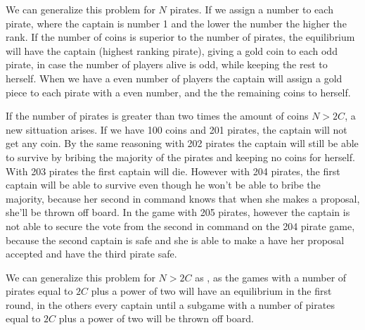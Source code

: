 We can generalize this problem for $N$ pirates. If we assign a number to each pirate, where the captain is number 1 and the lower the number the higher the rank. If the number of coins is superior to the number of pirates, the equilibrium will have the captain (highest ranking pirate), giving a gold coin to each odd pirate, in case the number of players alive is odd, while keeping the rest to herself. When we have a even number of players the captain will assign a gold piece to each pirate with a even number, and the the remaining coins to herself. 

If the number of pirates is greater than two times the amount of coins $N>2C$, a new sittuation arises. If we have 100 coins and 201 pirates, the captain will not get any coin. By the same reasoning with 202 pirates the captain will still be able to survive by bribing the majority of the pirates and keeping no coins for herself. With 203 pirates the first captain will die. However with 204 pirates, the first captain will be able to survive even though he won't be able to bribe the majority, because her second in command knows that when she makes a proposal, she'll be thrown off board. In the game with 205 pirates, however the captain is not able to secure the vote from the second in command on the 204 pirate game, because the second captain is safe and she is able to make a have her proposal accepted and have the third pirate safe. 

We can generalize this problem for $N>2C$ as \cite{Stewart1999}, as the games with a number of pirates equal to $2C$ plus a power of two will have an equilibrium in the first round, in the others every captain until a subgame with a number of pirates equal to $2C$ plus a power of two will be thrown off board.

